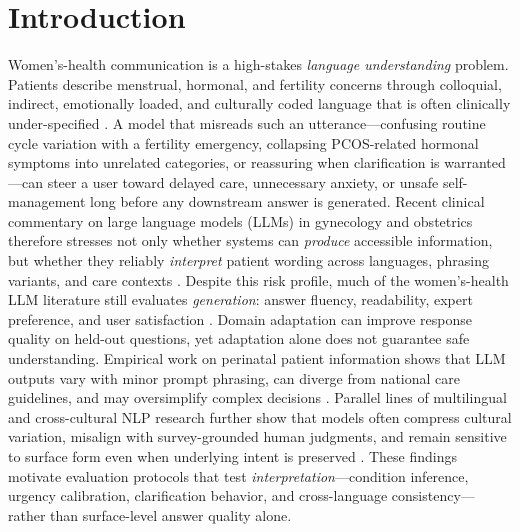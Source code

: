
\section{Introduction}

Women's-health communication is a high-stakes \emph{language understanding} problem.
Patients describe menstrual, hormonal, and fertility concerns through colloquial, indirect, emotionally loaded, and culturally coded language that is often clinically under-specified \cite{recker-etal-2025-large}.
A model that misreads such an utterance---confusing routine cycle variation with a fertility emergency, collapsing PCOS-related hormonal symptoms into unrelated categories, or reassuring when clarification is warranted---can steer a user toward delayed care, unnecessary anxiety, or unsafe self-management long before any downstream answer is generated.
Recent clinical commentary on large language models (LLMs) in gynecology and obstetrics therefore stresses not only whether systems can \emph{produce} accessible information, but whether they reliably \emph{interpret} patient wording across languages, phrasing variants, and care contexts \cite{recker-etal-2025-large,devries-etal-2025-enhancing}.
Despite this risk profile, much of the women's-health LLM literature still evaluates \emph{generation}: answer fluency, readability, expert preference, and user satisfaction \cite{adhikary-etal-2025-menstrual,recker-etal-2025-large}.
Domain adaptation can improve response quality on held-out questions, yet adaptation alone does not guarantee safe understanding.
Empirical work on perinatal patient information shows that LLM outputs vary with minor prompt phrasing, can diverge from national care guidelines, and may oversimplify complex decisions \cite{devries-etal-2025-enhancing,wang-etal-2024-prompt}.
Parallel lines of multilingual and cross-cultural NLP research further show that models often compress cultural variation, misalign with survey-grounded human judgments, and remain sensitive to surface form even when underlying intent is preserved \cite{mohammadi-etal-2025-large,nicholls-alperin-2025-cross}.
These findings motivate evaluation protocols that test \emph{interpretation}---condition inference, urgency calibration, clarification behavior, and cross-language consistency---rather than surface-level answer quality alone.

